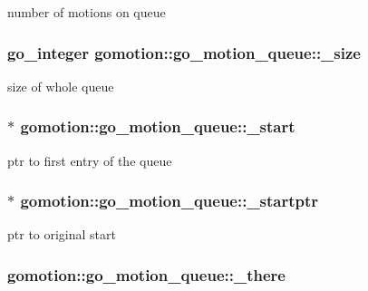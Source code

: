 number of motions on queue \hypertarget{structgomotion_1_1go__motion__queue_adc9cde829948ecc241cdcaa5b839c888}{
\subsubsection[{\-\_\-size}]{\setlength{\rightskip}{0pt plus 5cm}go\-\_\-integer gomotion\-::go\-\_\-motion\-\_\-queue\-::\-\_\-size\hspace{0.3cm}{\ttfamily [protected]}}}\label{structgomotion_1_1go__motion__queue_adc9cde829948ecc241cdcaa5b839c888}
size of whole queue \hypertarget{structgomotion_1_1go__motion__queue_aa48dfdfd799a6cf63856b760d264c23b}{
\subsubsection[{\-\_\-start}]{$\ast$ gomotion\-::go\-\_\-motion\-\_\-queue\-::\-\_\-start\hspace{0.3cm}{\ttfamily [protected]}}}\label{structgomotion_1_1go__motion__queue_aa48dfdfd799a6cf63856b760d264c23b}
ptr to first entry of the queue \hypertarget{structgomotion_1_1go__motion__queue_a0115449f0ee391d3e1d473e5861d594e}{
\subsubsection[{\-\_\-startptr}]{$\ast$ gomotion\-::go\-\_\-motion\-\_\-queue\-::\-\_\-startptr\hspace{0.3cm}{\ttfamily [protected]}}}\label{structgomotion_1_1go__motion__queue_a0115449f0ee391d3e1d473e5861d594e}
ptr to original start \hypertarget{structgomotion_1_1go__motion__queue_a96ac4977f0e8c0a01930f945262015fa}{
\subsubsection[{\-\_\-there}]{ gomotion\-::go\-\_\-motion\-\_\-queue\-::\-\_\-there\hspace{0.3cm}{\ttfamily [protected]}}}\label{structgomotion_1_1go__motion__queue_a96ac4977f0e8c0a01930f945262015fa}
